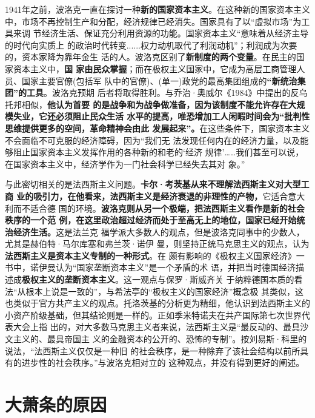 1941年之前，波洛克一直在探讨一种\textbf{新的国家资本主义}。在这种新的国家资本主义
中，市场不再控制生产和分配，经济规律已经消失。国家具有了以“虚拟市场”为工具来调
节经济生活、保证充分利用资源的功能。国家资本主义“意味着从经济主导的时代向实质上
的政治时代转变......权力动机取代了利润动机”；利润成为次要的，资本家降为靠年金生
活的人。波洛克区别了\textbf{新制度的两个变量}。在民主的国家资本主义中，\textbf{国
  家由民众掌握}；而在极权主义国家中，它成为高层工商管理人员、国家主要官僚(包括军
队中的官僚)、(单一)政党的最高集团组成的\textbf{“新统治集团”的工具}。波洛克预期
后者将取得胜利。与乔治·奥威尔《1984》中提出的反乌托邦相似，\textbf{他认为首要
  的是战争和为战争做准备，因为该制度不能允许存在大规模失业，它还必须阻止民众生活
  水平的提高，唯恐增加工人闲暇时间会为“批判性思维提供更多的空间，革命精神会由此
  发展起来”。}在这些条件下，国家资本主义不会面临不可克服的经济障碍，因为“我们无
法发现任何内在的经济力量，以及能够阻止国家资本主义发挥作用的各种新的和老的‘经济
规律’……我们甚至可以说，在国家资本主义中，经济学作为一门社会科学已经失去其对
象。”

与此密切相关的是法西斯主义问题。\textbf{卡尔·考茨基从来不理解法西斯主义对大型工商
业的吸引力，在他看来，法西斯主义是经济衰退的非理性的产物，}它适合意大利而不适合德
国的环境。\textbf{波洛克则从另一个极端，把法西斯主义看作是新的社会秩序的一个范
例，在这里政治超过经济而处于至高无上的地位，国家已经开始统治经济生活。}这是法兰克
福学派大多数人的观点，但是波洛克同事中的少数人，尤其是赫伯特·马尔库塞和弗兰茨·诺伊
曼，则坚持正统马克思主义的观点，认为\textbf{法西斯主义是资本主义专制的一种形式}。在
颇有影响的《极权主义国家经济》一书中，诺伊曼认为“国家垄断资本主义”是一个矛盾的术
语，并把当时德国经济描述成\textbf{极权主义的垄断资本主义}。这一观点与保罗·斯威齐关
于纳粹德国本质的看法“从根本上说是一致的”，与希法亭的“极权主义的国家经济”概念极
其类似，这也类似于官方共产主义的观点。托洛茨基的分析更为精细，他认识到法西斯主义的
小资产阶级基础，但其结论则是一样的。正如季米特诺夫在共产国际第七次世界代表大会上指
出的，对大多数马克思主义者来说，法西斯主义是“最反动的、最具沙文主义的、最具帝国主
义的金融资本的公开的、恐怖的专制”。按刘易斯·科里的说法，“法西斯主义仅仅是一种旧
的社会秩序，是一种除弃了该社会结构以前所具有的进步性的社会秩序。”与波洛克相对立的
这种观点，并没有得到更好的阐述。
\vfill

\section{大萧条的原因}

